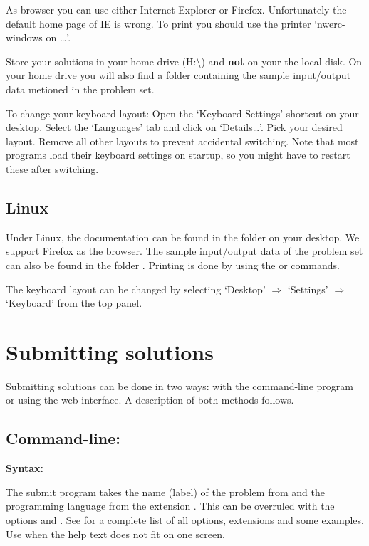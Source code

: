 As browser you can use either Internet Explorer or Firefox. Unfortunately the
default home page of IE is wrong.
To print you should use the printer `nwerc-windows on \ldots'.

Store your solutions in your home drive (H:\textbackslash) and \textbf{not} on
your the local disk. On your home drive you will also find a folder
 containing the sample input/output data metioned in the
problem set.

To change your keyboard layout: Open the `Keyboard Settings' shortcut on your
desktop. Select the `Languages' tab and click on `Details\ldots'. Pick your
desired layout. Remove all other layouts to prevent accidental switching. Note
that most programs load their keyboard settings on startup, so you might have
to restart these after switching.

\enlargethispage{2em}

\subsection{Linux}

Under Linux, the documentation can be found in the folder
 on your desktop. We support Firefox as the browser.
The sample input/output data of the problem set can also be found in the folder
.
Printing is done by using the  or  commands.

The keyboard layout can be changed by selecting `Desktop' $\Rightarrow$
`Settings' $\Rightarrow$ `Keyboard' from the top panel.

\newpage

\section{Submitting solutions}\label{submit}

Submitting solutions can be done in two ways: with the command-line program
 or using the web interface.  A description of both methods
follows.

\subsection{Command-line: }

\textbf{Syntax:} 

The submit program takes the name (label) of the problem from
 and the programming language from the extension
. This can be overruled with the options
 and .
See  for a complete list of all options,
extensions and some examples.  Use 
when the help text does not fit on one screen.

